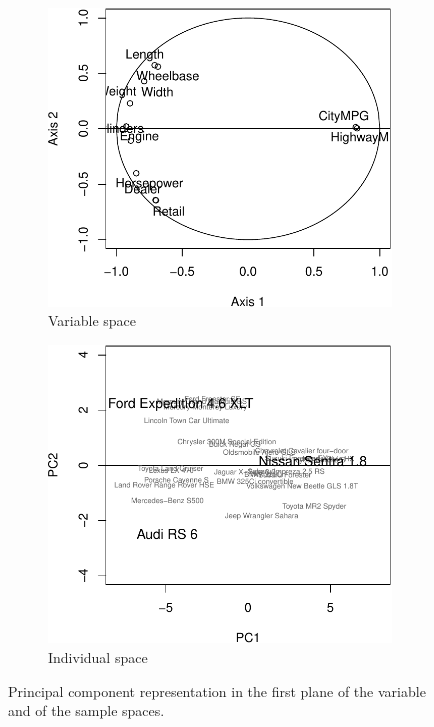 \documentclass[
  11pt,
  a4paper,
]{article}
\begin{document}
\begin{figure}[htp]
  \centering
  \begin{subfigure}[b]{0.47\textwidth}

\begin{center}\includegraphics{TD-PCA-correc_files/figure-latex/unnamed-chunk-7-1} \end{center}
     \caption{Variable space}
     \label{fig:cars04:PCA:variable}
  \end{subfigure}
  \hspace{5pt}
  \begin{subfigure}[b]{0.47\textwidth}

\begin{center}\includegraphics{TD-PCA-correc_files/figure-latex/unnamed-chunk-8-1} \end{center}
    \caption{Individual space}
     \label{fig:cars04:PCA:individual}
  \end{subfigure}
\caption{Principal component representation in the first plane of the variable and of the sample spaces.}
  \label{fig:cars04:PCA}
\end{figure}
\end{document}
